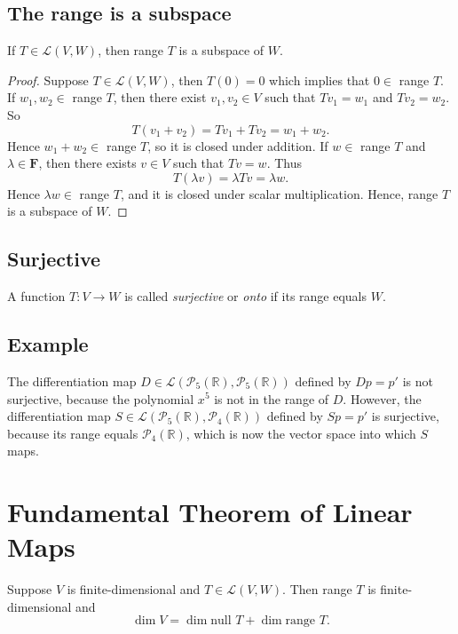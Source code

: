 \documentclass[11pt]{article}
\begin{document}
    \subsection{The range is a subspace}

    If \(T \in \mathcal{L}(V,W)\), then range $T$ is a subspace of $W$.

    \begin{proof}
        Suppose \(T \in \mathcal{L}(V,W)\), then \(T(0) = 0\) which implies that \(0 \in \) range $T$. If \(w_1, w_2 \in \) range $T$, then there exist \(v_1, v_2 \in V\) such that \(Tv_1 = w_1\) and \(Tv_2 = w_2\). So \[T(v_1 + v_2) = Tv_1 + Tv_2 = w_1 + w_2.\] Hence \(w_1 + w_2 \in \) range $T$, so it is closed under addition. If \(w \in \) range $T$ and \(\lambda \in \textbf{F}\), then there exists \(v \in V\) such that \(Tv = w\). Thus \[T(\lambda v) = \lambda Tv = \lambda w.\] Hence \(\lambda w \in \) range $T$, and it is closed under scalar multiplication. Hence, range $T$ is a subspace of $W$. 
    \end{proof}

    \subsection{Surjective}

    A function \(T:V \rightarrow W\) is called \emph{surjective} or \emph{onto} if its range equals $W$. 

    \subsection{Example}

    The differentiation map \(D \in \mathcal{L}(\mathcal{P}_5 (\mathbb{R}), \mathcal{P}_5 (\mathbb{R}))\) defined by \(Dp = p'\) is not surjective, because the polynomial $x^5$ is not in the range of $D$. However, the differentiation map \(S \in \mathcal{L}(\mathcal{P}_5 (\mathbb{R}), \mathcal{P}_4 (\mathbb{R}))\) defined by \(Sp = p'\) is surjective, because its range equals \(\mathcal{P}_4 (\mathbb{R})\), which is now the vector space into which $S$ maps. 

    \section{Fundamental Theorem of Linear Maps}

    Suppose $V$ is finite-dimensional and \(T \in \mathcal{L}(V,W)\). Then range $T$ is finite-dimensional and \[\dim V = \dim \text{null } T + \dim \text{range } T.\]
\end{document}
